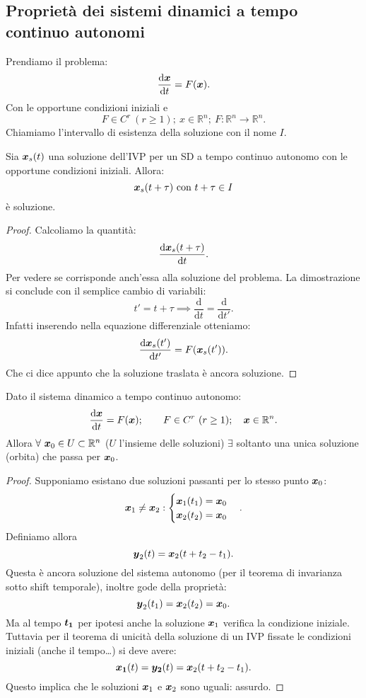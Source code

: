 \subsection{Proprietà dei sistemi dinamici a tempo continuo autonomi}%
\label{sub:Proprietà dei sistemi dinamici a tempo continuo autonomi}
Prendiamo il problema:
\[
	\frac{\text{d} \boldsymbol{x}}{\text{d} t} = F(\boldsymbol{x})
.\] 
Con le opportune condizioni iniziali e
\[
    F \in C^r \ (r\ge 1); \ x \in \mathbb{R}^n; \ F:\mathbb{R}^n\to \mathbb{R}^n
.\] 
Chiamiamo l'intervallo di esistenza della soluzione con il nome $I$.
\begin{thm}
    Sia $\boldsymbol{x}_s(t)$ una soluzione dell'IVP per un SD a tempo continuo autonomo con le opportune condizioni iniziali. Allora: 
    \[
	\boldsymbol{x}_s(t+\tau) \text{ con } t + \tau  \in I 
    \] 
    è soluzione.
\end{thm}
\noindent
\begin{proof}
    Calcoliamo la quantità:
    \[
	\frac{\text{d} \boldsymbol{x}_s(t+\tau)}{\text{d} t} 
    .\] 
    Per vedere se corrisponde anch'essa alla soluzione del problema. La dimostrazione si conclude con il semplice cambio di variabili:
    \[
        t' = t + \tau  \implies  \frac{\text{d} }{\text{d} t} = \frac{\text{d} }{\text{d} t'} 
    .\] 
    Infatti inserendo nella equazione differenziale otteniamo:
    \[
	\frac{\text{d} \boldsymbol{x}_s(t')}{\text{d} t'} = F(\boldsymbol{x}_s(t'))
    .\] 
    Che ci dice appunto che la soluzione traslata è ancora soluzione.
\end{proof}
\begin{thm}
    Dato il sistema dinamico a tempo continuo autonomo:
    \[
	\frac{\text{d} \boldsymbol{x}}{\text{d} t} = F(\boldsymbol{x}); \qquad F \in C^r \ (r\ge 1); \quad \boldsymbol{x}\in\mathbb{R}^n
    .\] 
    Allora $\forall \ \boldsymbol{x}_0 \in U \subset \mathbb{R}^n$ ($U$ l'insieme delle soluzioni) $\exists$ soltanto una unica soluzione (orbita) che passa per $\boldsymbol{x}_0$.
\end{thm}
\begin{proof}
    Supponiamo esistano due soluzioni passanti per lo stesso punto $\boldsymbol{x}_0$:
    \[
        \boldsymbol{x}_1 \neq \boldsymbol{x}_2: 
	\begin{cases}
	    \boldsymbol{x}_1(t_1)=\boldsymbol{x}_0\\
	    \boldsymbol{x}_2(t_2)=\boldsymbol{x}_0
	\end{cases}
    .\] 
    Definiamo allora 
    \[
	\boldsymbol{y}_2(t)=\boldsymbol{x}_2(t+t_2-t_1)
    .\] 
    Questa è ancora soluzione del sistema autonomo (per il teorema di invarianza sotto shift temporale), inoltre gode della proprietà:
    \[
	\boldsymbol{y}_2(t_1)=\boldsymbol{x}_2(t_2)=\boldsymbol{x}_0
    .\] 
    Ma al tempo $\boldsymbol{t_1}$ per ipotesi anche la soluzione $\boldsymbol{x}_1$ verifica la condizione iniziale.\\
    Tuttavia per il teorema di unicità della soluzione di un IVP fissate le condizioni iniziali (anche il tempo\ldots) si deve avere:
    \[
	\boldsymbol{x_1} (t)=\boldsymbol{y_2} (t) = \boldsymbol{x}_2(t+t_2-t_1)
    .\] 
    Questo implica che le soluzioni $\boldsymbol{x}_1$ e $\boldsymbol{x}_2$ sono uguali: assurdo.
\end{proof}
\noindent
